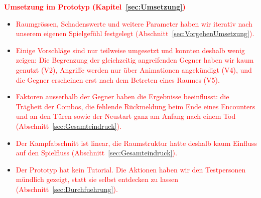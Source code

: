 \documentclass[../Main.tex]{subfiles}
\begin{document}
\textcolor{red}{\textbf{Umsetzung im Prototyp (Kapitel~\ref{sec:Umsetzung})}}
\begin{itemize}[leftmargin=1.5cm]
    \item \textcolor{red}{Raumgrössen, Schadenswerte und weitere Parameter haben wir iterativ nach unserem eigenen Spielgefühl festgelegt (Abschnitt~\ref{sec:VorgehenUmsetzung}).}
    \item \textcolor{red}{Einige Vorschläge sind nur teilweise umgesetzt und konnten deshalb wenig zeigen: Die Begrenzung der gleichzeitig angreifenden Gegner haben wir kaum genutzt (V2), Angriffe werden nur über Animationen angekündigt (V4), und die Gegner erscheinen erst nach dem Betreten eines Raumes (V5).}
    \item \textcolor{red}{Faktoren ausserhalb der Gegner haben die Ergebnisse beeinflusst: die Trägheit der Combos, die fehlende Rückmeldung beim Ende eines Encounters und an den Türen sowie der Neustart ganz am Anfang nach einem Tod (Abschnitt~\ref{sec:Gesamteindruck}).}
    \item \textcolor{red}{Der Kampfabschnitt ist linear, die Raumstruktur hatte deshalb kaum Einfluss auf den Spielfluss (Abschnitt~\ref{sec:Gesamteindruck}).}
    \item \textcolor{red}{Der Prototyp hat kein Tutorial. Die Aktionen haben wir den Testpersonen mündlich gezeigt, statt sie selbst entdecken zu lassen (Abschnitt~\ref{sec:Durchfuehrung}).}
\end{itemize}
\end{document}
